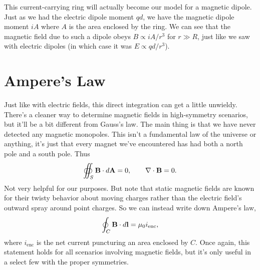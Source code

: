 \documentclass[../p051main.tex]{subfiles}
\begin{document}

This current-carrying ring will actually become our model for a magnetic dipole.
Just as we had the electric dipole moment $qd$, we have the magnetic dipole moment $iA$ where $A$ is the area enclosed by the ring.
We can see that the magnetic field due to such a dipole obeys $B \propto iA / r^3$ for $r \gg R$, just like we saw with electric dipoles (in which case it was $E \propto qd / r^3$).

\section{Ampere's Law}
Just like with electric fields, this direct integration can get a little unwieldy.
There's a cleaner way to determine magnetic fields in high-symmetry scenarios, but it'll be a bit different from Gauss's law.
The main thing is that we have never detected any magnetic monopoles.
This isn't a fundamental law of the universe or anything, it's just that every magnet we've encountered has had both a north pole and a south pole.
Thus
\[ \oiint_S \mathbf{B} \cdot d\mathbf{A} = 0, \qquad \nabla \cdot \mathbf{B} = 0. \]
Not very helpful for our purposes.
But note that static magnetic fields are known for their twisty behavior about moving charges rather than the electric field's outward spray around point charges.
So we can instead write down Ampere's law,
\[ \oint_C \mathbf{B} \cdot d\mathbf{l} = \mu_0 i_\textrm{enc}, \]
where $i_\textrm{enc}$ is the net current puncturing an area enclosed by $C$.
Once again, this statement holds for all scenarios involving magnetic fields, but it's only useful in a select few with the proper symmetries.
\end{document}
